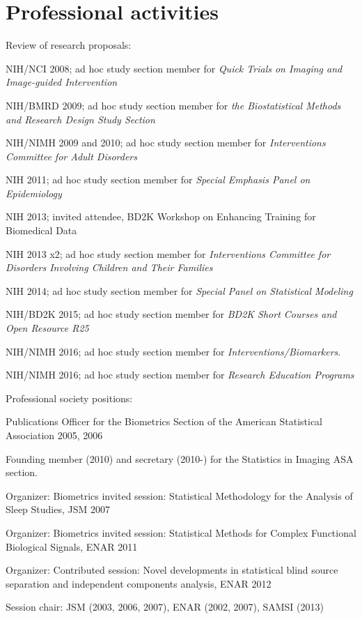 \documentclass[12pt]{article}
\begin{document}
\section*{Professional activities}
\begin{description}{}{}
\item Review of research proposals:
  \begin{description}
  \item NIH/NCI  2008; ad hoc study section member for {\it Quick Trials on Imaging and Image-guided Intervention}
  \item NIH/BMRD 2009; ad hoc study section member for {\it the Biostatistical Methods and Research Design Study Section}
  \item NIH/NIMH 2009 and 2010; ad hoc study section member for {\it Interventions Committee for Adult Disorders}
  \item NIH      2011; ad hoc study section member for {\it Special Emphasis Panel on Epidemiology} 
  \item NIH      2013; invited attendee, BD2K Workshop on Enhancing Training for Biomedical Data
  \item NIH		 2013 x2; ad hoc study section member for {\it Interventions Committee for Disorders Involving Children and Their Families}
  \item NIH 2014; ad hoc study section member for {\it Special Panel on Statistical Modeling}
  \item NIH/BD2K 2015; ad hoc study section member for {\it  BD2K Short Courses and Open Resource R25}
  \item NIH/NIMH 2016; ad hoc study section member for {\it Interventions/Biomarkers}.
  \item NIH/NIMH 2016; ad hoc study section member for {\it Research Education Programs}
  \end{description}
\item Professional society positions:
\begin{description}
\item Publications Officer for the Biometrics Section of the American Statistical Association 2005, 2006
\item Founding member (2010) and secretary (2010-) for the Statistics in Imaging ASA section.
\item Organizer: Biometrics invited session: Statistical Methodology for the Analysis of Sleep Studies, JSM 2007 
\item Organizer: Biometrics invited session: Statistical Methods for Complex Functional Biological Signals, ENAR 2011
\item Organizer: Contributed session: Novel developments in statistical blind source separation and independent components analysis, ENAR 2012
\item Session chair: JSM (2003, 2006, 2007), ENAR (2002, 2007), SAMSI (2013) 
\end{description}
\end{description}
\end{document}
